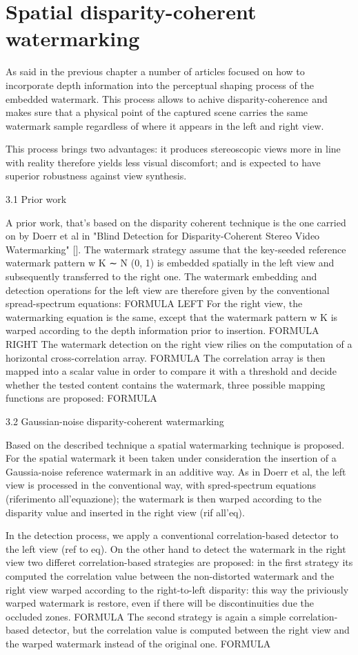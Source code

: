 \chapter{Spatial disparity-coherent watermarking}
\label{doer}

As said in the previous chapter a number of articles focused on how to incorporate depth information into the perceptual shaping process of the embedded watermark. This process allows to achive disparity-coherence and makes sure that a physical point of the captured scene carries the same watermark sample regardless of where it appears in the left and right view.

This process brings two advantages: it produces stereoscopic views more in line with reality therefore yields less visual discomfort; and is expected to have superior robustness against view synthesis.

3.1 Prior work

A prior work, that's based on the disparity coherent technique is the one carried on by Doerr et al in "Blind Detection for Disparity-Coherent
Stereo Video Watermarking" []. 
The watermark strategy  assume that the key-seeded reference watermark pattern w K ∼ N (0, 1) is embedded spatially in the left view and subsequently transferred to the right one.
The watermark embedding and detection operations for the left view are therefore given by the conventional spread-spectrum equations:
FORMULA LEFT 
For the right view, the watermarking equation is the same, except that the watermark pattern w K is warped according to the depth information prior to insertion.
FORMULA RIGHT
The watermark detection on the right view rilies on the computation of a horizontal cross-correlation array. 
FORMULA
The correlation array is then mapped into a scalar value in order to compare it with a threshold and decide whether the tested content contains the watermark, three possible mapping functions are proposed:
FORMULA


3.2 Gaussian-noise disparity-coherent watermarking

Based on the described technique a spatial watermarking technique is proposed.
For the spatial watermark it been taken under consideration the insertion of a Gaussia-noise reference watermark in an additive way.
As in Doerr et al, the left view is processed in the conventional way, with spred-spectrum equations (riferimento all'equazione); the watermark is then warped according to the disparity value and inserted in the right view (rif all'eq).

In the detection process, we apply a conventional correlation-based detector to the left view (ref to eq). 
On the other hand to detect the watermark in the right view two differet correlation-based strategies are proposed:
in the first strategy its computed the correlation value between the non-distorted watermark and the right view warped according to the right-to-left disparity: this way the priviously warped watermark is restore, even if there will be discontinuities due the occluded zones.
FORMULA
The second strategy is again a simple correlation-based detector, but the correlation value is computed between the right view and the warped watermark instead of the original one.
FORMULA  